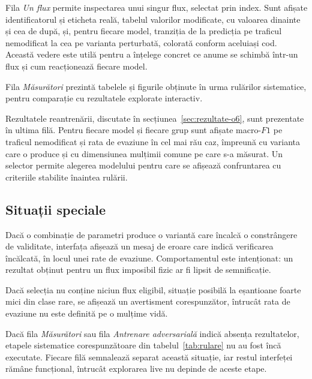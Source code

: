 Fila \textit{Un flux} permite inspectarea unui singur flux, selectat prin index. Sunt afișate identificatorul și eticheta reală, tabelul valorilor modificate, cu valoarea dinainte și cea de după, și, pentru fiecare model, tranziția de la predicția pe traficul nemodificat la cea pe varianta perturbată, colorată conform aceluiași cod. Această vedere este utilă pentru a înțelege concret ce anume se schimbă într-un flux și cum reacționează fiecare model.

Fila \textit{Măsurători} prezintă tabelele și figurile obținute în urma rulărilor sistematice, pentru comparație cu rezultatele explorate interactiv.

Rezultatele reantrenării, discutate în secțiunea~\ref{sec:rezultate-o6}, sunt prezentate în ultima filă. Pentru fiecare model și fiecare grup sunt afișate macro-$F1$ pe traficul nemodificat și rata de evaziune în cel mai rău caz, împreună cu varianta care o produce și cu dimensiunea mulțimii comune pe care s-a măsurat. Un selector permite alegerea modelului pentru care se afișează confruntarea cu criteriile stabilite înaintea rulării.

\subsection{Situații speciale}\label{subsec:situatii}

Dacă o combinație de parametri produce o variantă care încalcă o constrângere de validitate, interfața afișează un mesaj de eroare care indică verificarea încălcată, în locul unei rate de evaziune. Comportamentul este intenționat: un rezultat obținut pentru un flux imposibil fizic ar fi lipsit de semnificație.

Dacă selecția nu conține niciun flux eligibil, situație posibilă la eșantioane foarte mici din clase rare, se afișează un avertisment corespunzător, întrucât rata de evaziune nu este definită pe o mulțime vidă.

Dacă fila \textit{Măsurători} sau fila \textit{Antrenare adversarială} indică absența rezultatelor, etapele sistematice corespunzătoare din tabelul~\ref{tab:rulare} nu au fost încă executate. Fiecare filă semnalează separat această situație, iar restul interfeței rămâne funcțional, întrucât explorarea live nu depinde de aceste etape.
